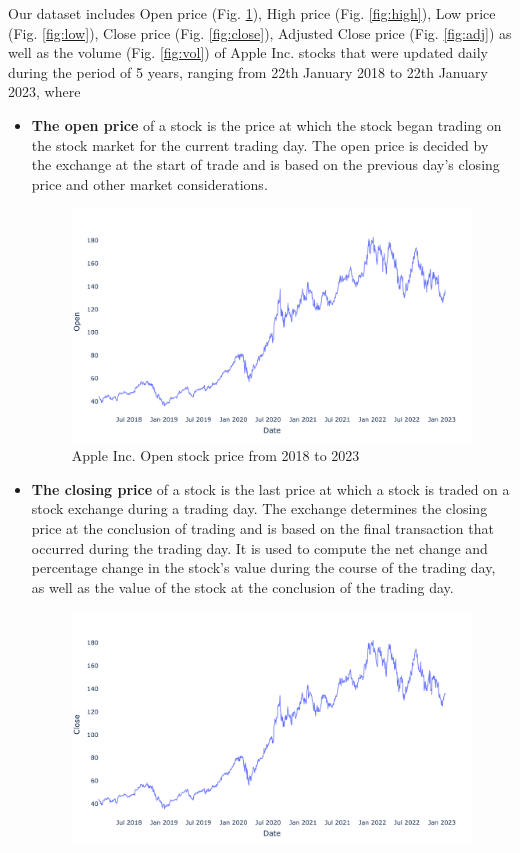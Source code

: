 \documentclass[a4paper]{article}
\begin{document}
Our dataset includes Open price (Fig. \ref{fig:open}), High price (Fig. \ref{fig:high}), Low price (Fig. \ref{fig:low}), Close price (Fig. \ref{fig:close}), Adjusted Close price (Fig. \ref{fig:adj}) as well as the volume (Fig. \ref{fig:vol}) of Apple Inc. stocks that were updated daily during the period of 5 years, ranging from 22th January 2018 to 22th January 2023, where
\begin{itemize}[leftmargin=7.5pt]
    \item \textbf{The open price} of a stock is the price at which the stock began trading on the stock market for the current trading day. The open price is decided by the exchange at the start of trade and is based on the previous day's closing price and other market considerations.
    \begin{figure}[!h]
    \centering
    \includegraphics[width=15cm]{open.png}
    \caption{Apple Inc. Open stock price from 2018 to 2023}
    \label{fig:open}
\end{figure}
    \item \textbf{The closing price} of a stock is the last price at which a stock is traded on a stock exchange during a trading day. The exchange determines the closing price at the conclusion of trading and is based on the final transaction that occurred during the trading day. It is used to compute the net change and percentage change in the stock's value during the course of the trading day, as well as the value of the stock at the conclusion of the trading day.
    \begin{figure}[!h]
    \centering
    \includegraphics[width=15cm]{close.png}

\end{figure}
\end{itemize}
\end{document}
